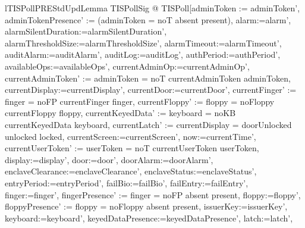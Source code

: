 \begin{theorem}{lTISPollPREStdUpdLemma}
   \forall TISPollSig @
   TISPoll[adminToken := adminToken',
                        adminTokenPresence' := (\IF adminToken = noT \THEN absent \ELSE present),
                        alarm:=alarm', alarmSilentDuration:=alarmSilentDuration',
                        alarmThresholdSize:=alarmThresholdSize',
                        alarmTimeout:=alarmTimeout', auditAlarm:=auditAlarm',
                        auditLog:=auditLog', authPeriod:=authPeriod',
                        availableOps:=availableOps',
                        currentAdminOp:=currentAdminOp',
                        currentAdminToken'
                          := \IF adminToken = noT
                             \THEN currentAdminToken
                             \ELSE adminToken, currentDisplay:=currentDisplay',
                        currentDoor:=currentDoor',
                        currentFinger'
                          := \IF finger = noFP
                             \THEN currentFinger
                             \ELSE finger,
                        currentFloppy'
                          := \IF floppy = noFloppy
                             \THEN currentFloppy
                             \ELSE floppy,
                        currentKeyedData'
                          := \IF keyboard = noKB
                             \THEN currentKeyedData
                             \ELSE keyboard,
                        currentLatch'
                          := \IF currentDisplay = doorUnlocked
                             \THEN unlocked
                             \ELSE locked, currentScreen:=currentScreen',
                        now:=currentTime',
                        currentUserToken'
                          := \IF userToken = noT
                             \THEN currentUserToken
                             \ELSE userToken, display:=display', door:=door',
                        doorAlarm:=doorAlarm',
                        enclaveClearance:=enclaveClearance',
                        enclaveStatus:=enclaveStatus', entryPeriod:=entryPeriod',
                        failBio:=failBio', failEntry:=failEntry', finger:=finger',
                        fingerPresence'
                          := \IF finger = noFP \THEN absent \ELSE present,
                        floppy:=floppy',
                        floppyPresence'
                          := \IF floppy = noFloppy \THEN absent \ELSE present,
                        issuerKey:=issuerKey', keyboard:=keyboard',
                        keyedDataPresence:=keyedDataPresence', latch:=latch',

\end{theorem}
